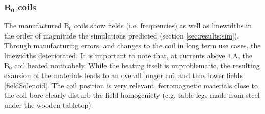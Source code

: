         \subsubsection{$\mathbf{B_0}$ coils}
        The manufactured $\mathrm{B_0}$ coils show fields (i.e. frequencies) as well as  linewidths in the order of magnitude the simulations predicted (section \ref{sec:results:sim}). Through manufacturing errors, and changes to the coil in long term use cases, the linewidths deteriorated. It is important to note that, at currents above $\SI{1}{\ampere}$, the $\mathrm{B_0}$ coil heated noiticabely. While the heating itself is unproblematic, the resulting exansion of the materials leads to an overall longer coil and thus lower fields \ref{fieldSolenoid}. The coil position is very relevant, ferromagnetic materials close to the coil bore clearly disturb the field homogeniety (e.g. table legs made from steel under the wooden tabletop).
